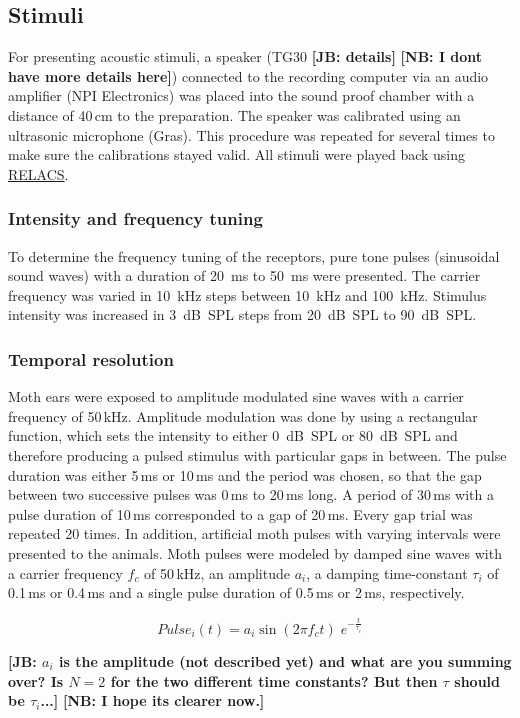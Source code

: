 \documentclass[12pt,a4paper]{article}
\newcommand{\relacs}[1]{\href{http://www.relacs.net}{#1}}
\newcommand{\note}[2][]{\textbf{[#1: #2]}}
\newcommand{\notejb}[1]{\note[JB]{#1}}
\newcommand{\notenb}[1]{\note[NB]{#1}}
\begin{document}
\subsection{Stimuli}
For presenting acoustic stimuli, a speaker (TG30 \notejb{details} \notenb{I dont have more details here}) connected to the recording computer via an audio amplifier (NPI Electronics) was placed into the sound proof chamber with a distance of 40\,cm to the preparation. The speaker was calibrated using an ultrasonic microphone (Gras). This procedure was repeated for several times to make sure the calibrations stayed valid. All stimuli were played back using \relacs{RELACS}.

\subsubsection{Intensity and frequency tuning}
To determine the frequency tuning of the receptors, pure tone pulses (sinusoidal sound waves) with a duration of 20~ms to 50~ms were presented. The carrier frequency was varied in 10~kHz steps between 10~kHz and 100~kHz. Stimulus intensity was increased in 3~dB~SPL steps from 20~dB~SPL to 90~dB~SPL.

\subsubsection{Temporal resolution}
Moth ears were exposed to amplitude modulated sine waves with a carrier frequency of 50\,kHz. Amplitude modulation was done by using a rectangular function, which sets the intensity to either 0~dB~SPL or 80~dB~SPL and therefore producing a pulsed stimulus with particular gaps in between. The pulse duration was either 5\,ms or 10\,ms and the period was chosen, so that the gap between two successive pulses was 0\,ms to 20\,ms long. A period of 30\,ms with a pulse duration of 10\,ms corresponded to a gap of 20\,ms. Every gap trial was repeated 20 times. In addition, artificial moth pulses with varying intervals were presented to the animals. Moth pulses were modeled by damped sine waves with a carrier frequency $f_{c}$ of 50\,kHz, an amplitude $a_i$, a damping time-constant $\tau_i$ of 0.1\,ms or 0.4\,ms and a single pulse duration of 0.5\,ms or 2\,ms, respectively.

\begin{equation}
	\label{eq:DampedSine}
	Pulse_i(t) =  a_i \sin(2 \pi f_c t) \; e^{-\frac{t}{\tau_i}}
\end{equation}

\notejb{$a_i$ is the amplitude (not described yet) and what are you summing over? Is $N=2$ for the two different time constants? But then $\tau$ should be $\tau_i$...} \notenb{I hope its clearer now.}
\end{document}
